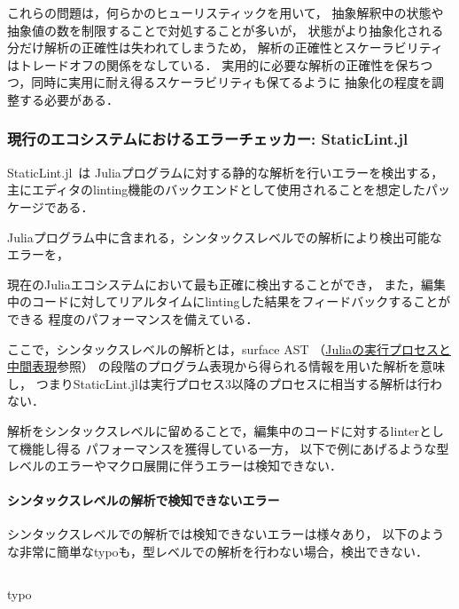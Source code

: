 これらの問題は，何らかのヒューリスティックを用いて，
抽象解釈中の状態や抽象値の数を制限することで対処することが多いが，
状態がより抽象化される分だけ解析の正確性は失われてしまうため，
解析の正確性とスケーラビリティはトレードオフの関係をなしている．
実用的に必要な解析の正確性を保ちつつ，同時に実用に耐え得るスケーラビリティも保てるように
抽象化の程度を調整する必要がある．

\subsubsection{現行のエコシステムにおけるエラーチェッカー: StaticLint.jl} \label{subsubsection:staticlint}

StaticLint.jl~\cite{staticlint}は
Juliaプログラムに対する静的な解析を行いエラーを検出する，
主にエディタのlinting機能のバックエンドとして使用されることを想定したパッケージである．

Juliaプログラム中に含まれる，シンタックスレベルでの解析により検出可能なエラーを，
\date{\today}現在のJuliaエコシステムにおいて最も正確に検出することができ，
また，編集中のコードに対してリアルタイムにlintingした結果をフィードバックすることができる
程度のパフォーマンスを備えている．

ここで，シンタックスレベルの解析とは，surface AST
（\hyperref[subsubsection:eval-process]{Juliaの実行プロセスと中間表現}参照）
の段階のプログラム表現から得られる情報を用いた解析を意味し，
つまりStaticLint.jlは実行プロセス3以降のプロセスに相当する解析は行わない．

解析をシンタックスレベルに留めることで，編集中のコードに対するlinterとして機能し得る
パフォーマンスを獲得している一方，
以下で例にあげるような型レベルのエラーやマクロ展開に伴うエラーは検知できない．

\paragraph{シンタックスレベルの解析で検知できないエラー} \label{paragraph:syntax-analysis-limitation}

シンタックスレベルでの解析では検知できないエラーは様々あり，
以下のような非常に簡単なtypoも，型レベルでの解析を行わない場合，検出できない．

\begin{listing}[ht]
  \inputminted[frame=lines, linenos, firstnumber=1, firstline=23, lastline=33]{julia}{./src/typo.jl}
  \caption{typo}
  \label{lst:target3}
\end{listing}

